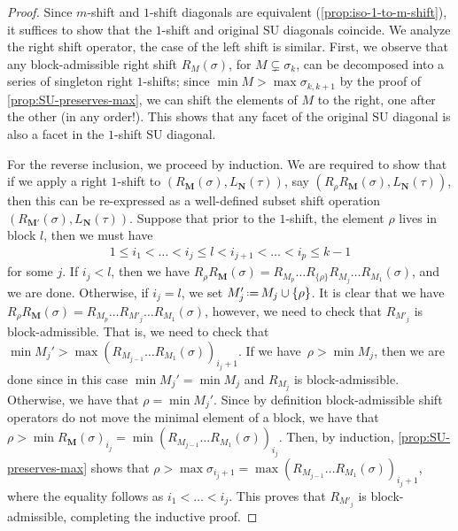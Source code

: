 \documentclass{amsart}
\theoremstyle{definition}
\newcommand{\eqdef}{\mbox{\,\raisebox{0.2ex}{\scriptsize\ensuremath{\mathrm:}}\ensuremath{=}\,}} %
\newcommand{\SU}{\mathrm{SU}}
\begin{document}
\begin{proof}
Since $m$-shift and $1$-shift diagonals are equivalent (\cref{prop:iso-1-to-m-shift}), it suffices to show that the $1$-shift and original $\SU$ diagonals coincide. 
We analyze the right shift operator, the case of the left shift is similar. 
First, we observe that any block-admissible right shift $R_{M}(\sigma)$, for $M\subsetneq\sigma_k$, can be decomposed into a series of singleton right $1$-shifts; since $\min M > \max \sigma_{k,k+1}$ by the proof of \cref{prop:SU-preserves-max}, we can shift the elements of $M$ to the right, one after the other (in any order!).
This shows that any facet of the original $\SU$ diagonal is also a facet in the $1$-shift $\SU$ diagonal.

For the reverse inclusion, we proceed by induction. 
We are required to show that if we apply a right $1$-shift to $(R_{\mathbf{M}}(\sigma),L_{\mathbf{N}}(\tau))$, say $(R_{\rho}R_{\mathbf{M}}(\sigma),L_{\mathbf{N}}(\tau))$, then this can be re-expressed as a well-defined subset shift operation $(R_{\mathbf{M'}}(\sigma),L_{\mathbf{N}}(\tau))$. 
Suppose that prior to the $1$-shift, the element $\rho$ lives in block $l$, then we must have
\begin{align*}
	1 \leq i_1 < \dots < i_j \leq l < i_{j+1} <\dots< i_p \leq k-1
\end{align*}
for some $j$. 
If $i_j < l$, then we have $R_{\rho}R_{\mathbf{M}}(\sigma) = R_{M_{p}}\dots R_{\{\rho\}}R_{M_{j}}\dots R_{M_{1}}(\sigma)$, and we are done.
Otherwise, if $i_j = l$, we set $M'_{j} \eqdef M_{j} \cup \{\rho \}$. 
It is clear that we have $R_{\rho}R_{\mathbf{M}}(\sigma) = R_{M_{p}}\dots R_{M'_{j}}\dots R_{M_{1}}(\sigma)$, however, we need to check that $R_{M'_{j}}$ is block-admissible. 
That is, we need to check that $\min M_{j}' > \max (R_{M_{j-1}}\dots R_{M_{1}}(\sigma))_{i_j+1}$.
If we have~$\rho > \min M_{j}$, then we are done since in this case $\min M_{j}'=\min M_{j}$ and $R_{M_{j}}$ is block-admissible.
Otherwise, we have that $\rho=\min M_{j}'$. 
Since by definition block-admissible shift operators do not move the minimal element of a block, we have that $\rho > \min R_{\mathbf{M}}(\sigma)_{i_j}= \min (R_{M_{j-1}}\dots R_{M_{1}}(\sigma))_{i_j}$.
Then, by induction, \cref{prop:SU-preserves-max} shows that $\rho>\max \sigma_{i_j+1} = \max (R_{M_{j-1}}\dots R_{M_{1}}(\sigma))_{i_j + 1}$, where the equality follows as $i_1<\dots<i_j$. 
This proves that $R_{M'_{j}}$ is block-admissible, completing the inductive proof.
\end{proof}
\end{document}
